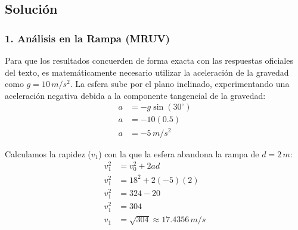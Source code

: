 \documentclass[12pt, a4paper]{article}
\begin{document}
\begin{center}
\end{center}

\subsection*{Solución}

\subsubsection*{1. Análisis en la Rampa (MRUV)}
Para que los resultados concuerden de forma exacta con las respuestas oficiales del texto, es matemáticamente necesario utilizar la aceleración de la gravedad como $g = 10 \, \si{m/s^2}$. 
La esfera sube por el plano inclinado, experimentando una aceleración negativa debida a la componente tangencial de la gravedad:
\begin{align*}
a &= -g \sin(30^\circ) \\
a &= -10 (0.5) \\
a &= -5 \, \si{m/s^2}
\end{align*}

Calculamos la rapidez ($v_1$) con la que la esfera abandona la rampa de $d = 2 \, \si{m}$:
\begin{align*}
v_1^2 &= v_0^2 + 2ad \\
v_1^2 &= 18^2 + 2(-5)(2) \\
v_1^2 &= 324 - 20 \\
v_1^2 &= 304 \\
v_1 &= \sqrt{304} \approx 17.4356 \, \si{m/s}
\end{align*}
\end{document}
